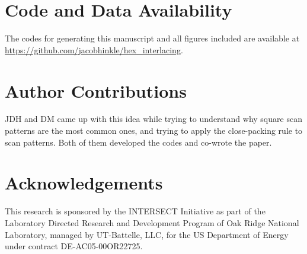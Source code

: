 \documentclass[aip, amsmath, amssymb, nobibnotes, nofootinbib, citeautoscript, reprint, superscriptaddress]{revtex4-2}
\begin{document}
    \section{Code and Data Availability}

    The codes for generating this manuscript and all figures included are available at \url{https://github.com/jacobhinkle/hex_interlacing}. 

    \section{\label{sec:contribs}Author Contributions}
    JDH and DM came up with this idea while trying to understand why square scan patterns are the most common ones, and trying to apply the close-packing rule to scan patterns. Both of them developed the codes and co-wrote the paper.

    \section{\label{sec:acknowledgement}Acknowledgements}

    This research is sponsored by the INTERSECT Initiative as part of the Laboratory Directed Research and Development Program of Oak Ridge National Laboratory, managed by UT-Battelle, LLC, for the US Department of Energy under contract DE-AC05-00OR22725. 
    
    
\end{document}
